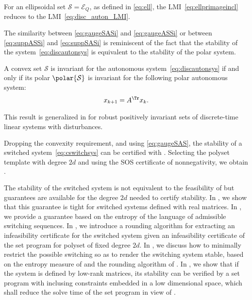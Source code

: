 \documentclass[11pt,twoside,a4paper,openright]{uclouvain-thesis}
\begin{document}
For an ellipsoidal set $\mathcal{S} = \mathcal{E}_Q$, as defined in \eqref{eq:ell}, the LMI~\eqref{eq:ellprimageincl} reduces to the LMI~\eqref{eq:disc_auton_LMI}.

The similarity between \eqref{eq:gaugeSASi} and \eqref{eq:gaugeASSi} or between \eqref{eq:suppASSi} and \eqref{eq:suppSASi}
is reminiscent of the fact that the stability of the system~\eqref{eq:discautonsys} is equivalent to the stability of the polar system.
\begin{mycoro}
  A convex set $\mathcal{S}$ is invariant for the autonomous system~\eqref{eq:discautonsys} if and only if its polar $\polar{\mathcal{S}}$
  is invariant for the following polar autonomous system:
  \begin{equation*}
    x_{k+1} = A^\Tr x_k.
  \end{equation*}
\end{mycoro}
This result is generalized in \cite{rakovic2017minkowski} for robust positively invariant sets of discrete-time linear systems with disturbances.

Dropping the convexity requirement, and using \eqref{eq:gaugeSAS}, the stability of a switched system~\eqref{eq:cswitchsys} can be certified with .
Selecting the polyset template with degree $2d$ and using the SOS certificate of nonnegativity,
we obtain .

The stability of the switched system is not equivalent to the feasibility of  but guarantees are available for the degree $2d$ needed to certify stability.
In , we show that this guarantee is tight for switched systems defined with real matrices.
In , we provide a guarantee based on the entropy of the language of admissible switching sequences.
In , we introduce a rounding algorithm for extracting an infeasibility certificate for the switched system given an infeasibility certificate of the set program for polyset of fixed degree $2d$.
In , we discuss how to minimally restrict the possible switching
so as to render the switching system stable, based on the entropy measure of  and the rounding algorithm of .
In , we show that if the system is defined by low-rank matrices,
its stability can be verified by a set program with inclusing constraints embedded
in a low dimensional space, which shall reduce the solve time of the set program
in view of .
\end{document}
